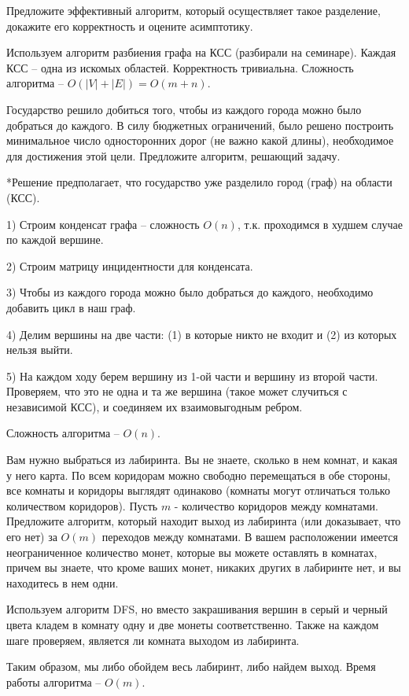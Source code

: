 \documentclass[12pt]{extreport}
\theoremstyle{definiton}
\theoremstyle{definition}
\theoremstyle{definition}
\newcounter{problem}
\newcounter{subproblem}
\def\beforPRskip{
	\bigskip
}
\def\PRSUBskip{
	\medskip
}
\def\pr{\beforPRskip\noindent\stepcounter{problem}{\bf \theproblem .\;}\setcounter{subproblem}{0}}
\def\prsub{\PRSUBskip\noindent\stepcounter{subproblem}{\sf \thesubproblem .} }
\def\prsubstar{\PRSUBskip\noindent\stepcounter{subproblem}{\rm $\thesubproblem^*$\negthickspace.  } }
\begin{document}
	\prsub Предложите эффективный алгоритм, который осуществляет такое разделение, докажите его корректность и оцените асимптотику.

		Используем алгоритм разбиения графа на КСС (разбирали на семинаре). Каждая КСС -- одна из искомых областей. Корректность тривиальна. Сложность алгоритма -- $O(|V| + |E|) = O(m + n)$.

	\prsubstar Государство решило добиться того, чтобы из каждого города можно было добраться до каждого. В силу бюджетных ограничений, было решено  построить минимальное число односторонних дорог (не важно какой длины), необходимое для достижения этой цели. Предложите алгоритм, решающий задачу.

		*Решение предполагает, что государство уже разделило город (граф) на области (КСС).

		1) Строим конденсат графа -- сложность $O(n)$, т.к. проходимся в худшем случае по каждой вершине.

		2) Строим матрицу инцидентности для конденсата.

		3) Чтобы из каждого города можно было добраться до каждого, необходимо добавить цикл в наш граф.

		4) Делим вершины на две части: (1) в которые никто не входит и (2) из которых нельзя выйти.

		5) На каждом ходу берем вершину из 1-ой части и вершину из второй части. Проверяем, что это не одна и та же вершина (такое может случиться с независимой КСС), и соединяем их взаимовыгодным ребром.

		Сложность алгоритма -- $O(n)$.

\pr Вам нужно выбраться из лабиринта. Вы не знаете, сколько в нем комнат, и какая у него карта. По всем коридорам можно свободно перемещаться в обе стороны, все комнаты и коридоры выглядят одинаково (комнаты могут отличаться только количеством коридоров). Пусть $m$ - количество коридоров между комнатами. Предложите алгоритм, который находит выход из лабиринта (или доказывает, что его нет) за $O(m)$ переходов между комнатами. В вашем расположении имеется неограниченное количество монет, которые вы можете оставлять в комнатах, причем вы знаете, что кроме ваших монет, никаких других в лабиринте нет, и вы находитесь в нем одни.

	Используем алгоритм DFS, но вместо закрашивания вершин в серый и черный цвета кладем в комнату одну и две монеты соответственно. Также на каждом шаге проверяем, является ли комната выходом из лабиринта.

	Таким образом, мы либо обойдем весь лабиринт, либо найдем выход. Время работы алгоритма -- $O(m)$.
\end{document}
